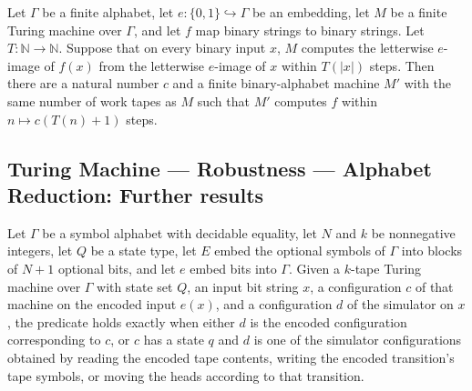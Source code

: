 \begin{theorem}
\label{Turing.FinTM.alphabet_reduction}
\leanok
{}
Let $\Gamma$ be a finite alphabet, let $e:\{0,1\}\hookrightarrow\Gamma$ be an embedding,
let $M$ be a finite Turing machine over $\Gamma$, and let $f$ map binary strings to
binary strings. Let $T:\mathbb{N}\to\mathbb{N}$. Suppose that on every binary input $x$,
$M$ computes the letterwise $e$-image of $f(x)$ from the letterwise $e$-image of $x$
within $T(|x|)$ steps. Then there are a natural number $c$ and a finite binary-alphabet
machine $M'$ with the same number of work tapes as $M$ such that $M'$ computes $f$
within $n\mapsto c(T(n)+1)$ steps.
\end{theorem}

\subsection*{Turing Machine --- Robustness --- Alphabet Reduction: Further results}

\begin{definition}
\label{Turing.FinTM.arSpacePhase}
\leanok
{}
Let $\Gamma$ be a symbol alphabet with decidable equality, let $N$ and $k$ be
nonnegative integers, let $Q$ be a state type, let $E$ embed the optional symbols of
$\Gamma$ into blocks of $N+1$ optional bits, and let $e$ embed bits into $\Gamma$. Given
a $k$-tape Turing machine over $\Gamma$ with state set $Q$, an input bit string $x$, a
configuration $c$ of that machine on the encoded input $e(x)$, and a configuration $d$
of the simulator on $x$, the predicate holds exactly when either $d$ is the encoded
configuration corresponding to $c$, or $c$ has a state $q$ and $d$ is one of the
simulator configurations obtained by reading the encoded tape contents, writing the
encoded transition's tape symbols, or moving the heads according to that transition.
\end{definition}

